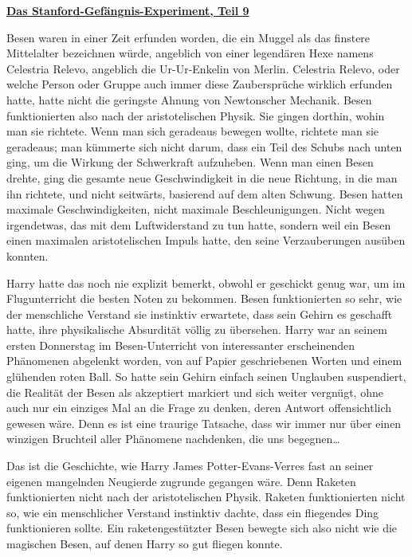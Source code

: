 

\hypertarget{das-stanford-gefuxe4ngnis-experiment-teil-9}{%

\textbf{\uline{Das Stanford-Gefängnis-Experiment, Teil 9}}

Besen waren in einer Zeit erfunden worden, die ein Muggel als das finstere Mittelalter bezeichnen würde, angeblich von einer legendären Hexe namens Celestria Relevo, angeblich die Ur-Ur-Enkelin von Merlin. Celestria Relevo, oder welche Person oder Gruppe auch immer diese Zaubersprüche wirklich erfunden hatte, hatte nicht die geringste Ahnung von Newtonscher Mechanik. Besen funktionierten also nach der aristotelischen Physik. Sie gingen dorthin, wohin man sie richtete. Wenn man sich geradeaus bewegen wollte, richtete man sie geradeaus; man kümmerte sich nicht darum, dass ein Teil des Schubs nach unten ging, um die Wirkung der Schwerkraft aufzuheben. Wenn man einen Besen drehte, ging die gesamte neue Geschwindigkeit in die neue Richtung, in die man ihn richtete, und nicht seitwärts, basierend auf dem alten Schwung. Besen hatten maximale Geschwindigkeiten, nicht maximale Beschleunigungen. Nicht wegen irgendetwas, das mit dem Luftwiderstand zu tun hatte, sondern weil ein Besen einen maximalen aristotelischen Impuls hatte, den seine Verzauberungen ausüben konnten.

Harry hatte das noch nie explizit bemerkt, obwohl er geschickt genug war, um im Flugunterricht die besten Noten zu bekommen. Besen funktionierten so sehr, wie der menschliche Verstand sie instinktiv erwartete, dass sein Gehirn es geschafft hatte, ihre physikalische Absurdität völlig zu übersehen. Harry war an seinem ersten Donnerstag im Besen-Unterricht von interessanter erscheinenden Phänomenen abgelenkt worden, von auf Papier geschriebenen Worten und einem glühenden roten Ball. So hatte sein Gehirn einfach seinen Unglauben suspendiert, die Realität der Besen als akzeptiert markiert und sich weiter vergnügt, ohne auch nur ein einziges Mal an die Frage zu denken, deren Antwort offensichtlich gewesen wäre. Denn es ist eine traurige Tatsache, dass wir immer nur über einen winzigen Bruchteil aller Phänomene nachdenken, die uns begegnen…

Das ist die Geschichte, wie Harry James Potter-Evans-Verres fast an seiner eigenen mangelnden Neugierde zugrunde gegangen wäre. Denn Raketen funktionierten nicht nach der aristotelischen Physik. Raketen funktionierten nicht so, wie ein menschlicher Verstand instinktiv dachte, dass ein fliegendes Ding funktionieren sollte. Ein raketengestützter Besen bewegte sich also nicht wie die magischen Besen, auf denen Harry so gut fliegen konnte.

}
